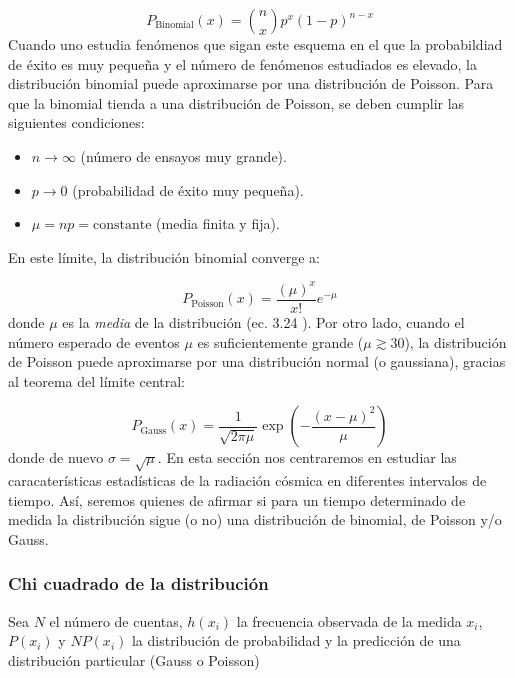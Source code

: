 \documentclass[11pt]{article}
\newcommand{\parentesis}[1]{\left( #1  \right)}
\begin{document}
\begin{equation}
    P_{\text{Binomial}}(x) = \binom{n}{x} p^x (1 - p)^{n - x}
\end{equation}
Cuando uno estudia fenómenos que sigan este esquema en el que la probabildiad de éxito es muy pequeña y el número de fenómenos estudiados es elevado, la distribución binomial puede aproximarse por una distribución de Poisson. Para que la binomial tienda a una distribución de Poisson, se deben cumplir las siguientes condiciones:

\begin{itemize}
    \item \( n \to \infty \) (número de ensayos muy grande).
    \item \( p \to 0 \) (probabilidad de éxito muy pequeña).
    \item \( \mu = np = \text{constante} \) (media finita y fija).
\end{itemize}

En este límite, la distribución binomial converge a:

\begin{equation}
	P_{\text{Poisson}}(x) = \frac{(\mu)^x}{x!} e^{-\mu}
\end{equation}
donde $\mu$ es la \textit{media} de la distribución (ec. 3.24 \cite{Knoll:1300754}). Por otro lado, cuando el número esperado de eventos \( \mu \) es suficientemente grande (\( \mu \gtrsim 30 \)), la distribución de Poisson puede aproximarse por una distribución normal (o gaussiana), gracias al teorema del límite central:

\begin{equation}
	P_{\text{Gauss}} (x) = \frac{1}{\sqrt{2\pi \mu}} \exp \parentesis{- \frac{(x-\mu)^2}{\mu}}
\end{equation}
donde de nuevo $\sigma=\sqrt{\mu}$. En esta sección nos centraremos en estudiar las caracaterísticas estadísticas de la radiación cósmica en diferentes intervalos de tiempo. Así, seremos quienes de afirmar si para un tiempo determinado de medida la distribución sigue (o no) una distribución de binomial, de Poisson y/o Gauss. 

\subsubsection{Chi cuadrado de la distribución}

Sea $N$ el número de cuentas, $h(x_i)$ la frecuencia observada de la medida $x_i$, $P(x_i)$ y $NP(x_i)$ la distribución de probabilidad y la predicción de una distribución particular (Gauss o Poisson)
\end{document}
